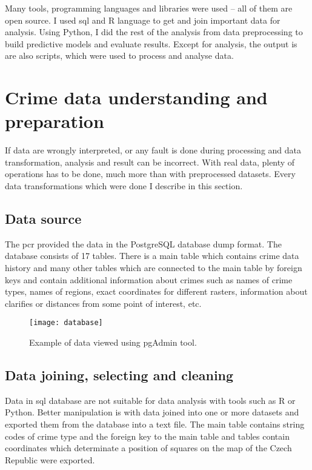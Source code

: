 \documentclass[thesis=M,english]{FITthesis}[2012/10/20]
\begin{document}
Many tools, programming languages and libraries were used -- all of them are open source. I used \gls{sql} and R language to get and join important data for analysis. Using Python, I did the rest of the analysis from data preprocessing to build predictive models and evaluate results. Except for analysis, the output is are also scripts, which were used to process and analyse data. 

\section{Crime data understanding and preparation}\label{sec:preprocessing}

If data are wrongly interpreted, or any fault is done during processing and data transformation, analysis and result can be incorrect. With real data, plenty of operations has to be done, much more than with preprocessed datasets. Every data transformations which were done I describe in this section.

\subsection{Data source}

The \gls{pcr} provided the data in the PostgreSQL database dump format. The database consists of 17 tables. There is a main table which contains crime data history and many other tables which are connected to the main table by foreign keys and contain additional information about crimes such as names of crime types, names of regions, exact coordinates for different rasters, information about clarifies or distances from some point of interest, etc.

\begin{figure}[ht]\centering
    \texttt{[image: database]}
    \caption{Example of data viewed using pgAdmin tool.}\label{fig:database}
\end{figure}

\subsection{Data joining, selecting and cleaning}

Data in \gls{sql} database are not suitable for data analysis with tools such as R or Python. Better manipulation is with data joined into one or more datasets and exported them from the database into a text file. The main table contains string codes of crime type and the foreign key to the main table and tables contain coordinates which determinate a position of squares on the map of the Czech Republic were exported. 
\end{document}

